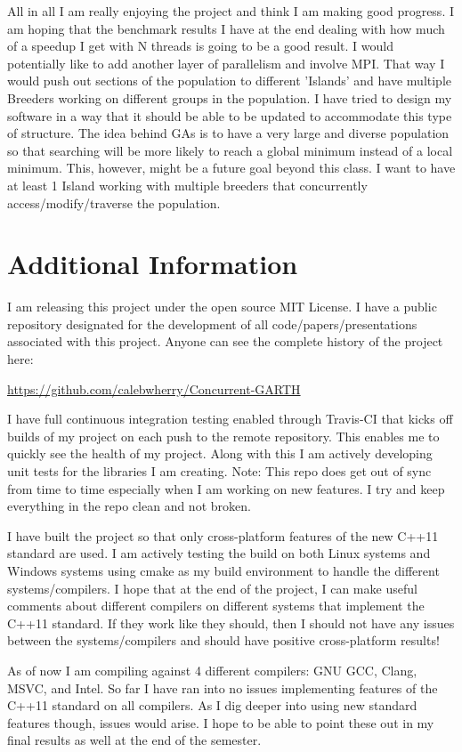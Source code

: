 \documentclass{acm_proc_article-sp}
\begin{document}
All in all I am really enjoying the project and think I am making good progress. I am hoping that the benchmark results I have at the end dealing with how much of a speedup I get with N threads is going to be a good result. I would potentially like to add another layer of parallelism and involve MPI. That way I would push out sections of the population to different 'Islands' and have multiple Breeders working on different groups in the population. I have tried to design my software in a way that it should be able to be updated to accommodate this type of structure. The idea behind GAs is to have a very large and diverse population so that searching will be more likely to reach a global minimum instead of a local minimum. This, however, might be a future goal beyond this class. I want to have at least 1 Island working with multiple breeders that concurrently access/modify/traverse the population.


%
\section{Additional Information}

I am releasing this project under the open source MIT License. I have a public repository designated for the development of all code/papers/presentations associated with this project. Anyone can see the complete history of the project here:

\url{https://github.com/calebwherry/Concurrent-GARTH}

I have full continuous integration testing enabled through Travis-CI that kicks off builds of my project on each push to the remote repository. This enables me to quickly see the health of my project. Along with this I am actively developing unit tests for the libraries I am creating. Note: This repo does get out of sync from time to time especially when I am working on new features. I try and keep everything in the repo clean and not broken.

I have built the project so that only cross-platform features of the new C++11 standard are used. I am actively testing the build on both Linux systems and Windows systems using cmake as my build environment to handle the different systems/compilers. I hope that at the end of the project, I can make useful comments about different compilers on different systems that implement the C++11 standard. If they work like they should, then I should not have any issues between the systems/compilers and should have positive cross-platform results!

As of now I am compiling against 4 different compilers: GNU GCC, Clang, MSVC, and Intel. So far I have ran into no issues implementing features of the C++11 standard on all compilers. As I dig deeper into using new standard features though, issues would arise. I hope to be able to point these out in my final results as well at the end of the semester.


%
%




%
%
\balancecolumns


%
%
\end{document}
